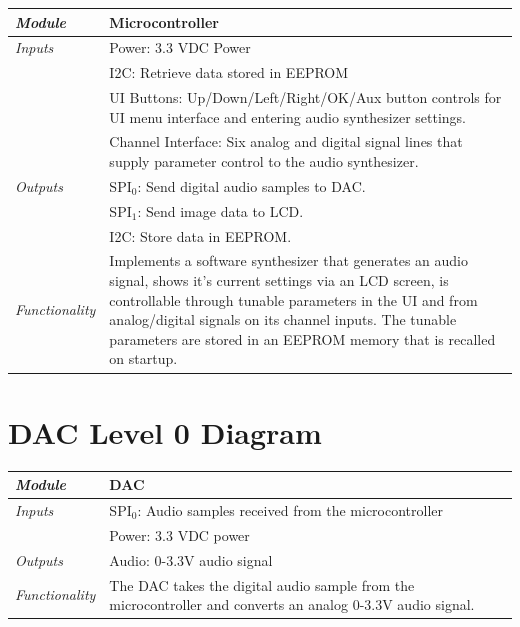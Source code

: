 \documentclass{article}
\begin{document}
\begin{tabular}{|p{1in}|p{5in}|}
\hline
\emph{Module} & Microcontroller \\
\hline
\emph{Inputs}& Power: 3.3 VDC Power\\
	     & I2C: Retrieve data stored in EEPROM\\
	     & UI Buttons: Up/Down/Left/Right/OK/Aux button controls for UI menu interface and entering audio synthesizer settings.\\
	     & Channel Interface: Six analog and digital signal lines that supply parameter control to the audio synthesizer.\\
\hline
\emph{Outputs}& SPI$_0$: Send digital audio samples to DAC.\\
	      & SPI$_1$: Send image data to LCD.\\
	      & I2C: Store data in EEPROM.\\ 
\hline
\emph{Functionality}& Implements a software synthesizer that generates an audio signal, shows it's current settings via an LCD screen, is controllable through tunable parameters in the UI and from analog/digital signals on its channel inputs. The tunable parameters are stored in an EEPROM memory that is recalled on startup.\\
\hline
\end{tabular}

\section{DAC Level 0 Diagram}

\begin{tabular}{|p{1in}|p{5in}|}
\hline
\emph{Module} & DAC \\
\hline
\emph{Inputs}& SPI$_0$: Audio samples received from the microcontroller\\
	     & Power: 3.3 VDC power\\
\hline
\emph{Outputs}& Audio: 0-3.3V audio signal \\ 
\hline
\emph{Functionality}& The DAC takes the digital audio sample from the microcontroller and converts an analog 0-3.3V audio signal.\\
\hline
\end{tabular}
\end{document}
